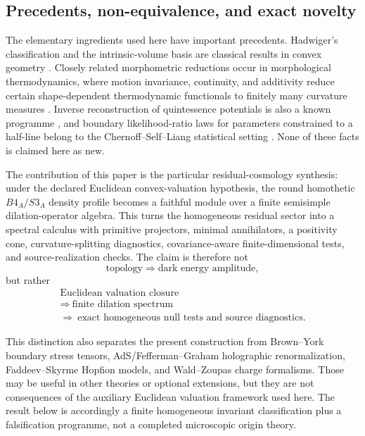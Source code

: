 \documentclass[11pt,a4paper]{article}
\def\Bfour{B4}%
\def\Sthree{S3}%
\numberwithin{equation}{section}
\theoremstyle{definition}
\theoremstyle{plain}
\theoremstyle{remark}
\newcommand{\Sthree}{S^3}
\newcommand{\Bfour}{B^4}
\begin{document}
\subsection{Precedents, non-equivalence, and exact novelty}
The elementary ingredients used here have important precedents.  Hadwiger's
classification and the intrinsic-volume basis are classical results in convex
geometry \cite{Hadwiger1957,Schneider2014}.  Closely related morphometric
reductions occur in morphological thermodynamics, where motion invariance,
continuity, and additivity reduce certain shape-dependent thermodynamic
functionals to finitely many curvature measures \cite{KonigRothMecke2004}.
Inverse reconstruction of quintessence potentials is also a known programme
\cite{SahlenLiddleParkinson2005}, and boundary likelihood-ratio laws for
parameters constrained to a half-line belong to the Chernoff--Self--Liang
statistical setting \cite{Chernoff1954,SelfLiang1987}.  None of these facts is
claimed here as new.

The contribution of this paper is the particular residual-cosmology synthesis:
under the declared Euclidean convex-valuation hypothesis, the round homothetic
\(\Bfour_A/\Sthree_A\) density profile becomes a faithful module over a finite
semisimple dilation-operator algebra.  This turns the homogeneous residual
sector into a spectral calculus with primitive projectors, minimal
annihilators, a positivity cone, curvature-splitting diagnostics,
covariance-aware finite-dimensional tests, and source-realization checks.  The
claim is therefore not
\begin{equation}
\text{topology}\Rightarrow\text{dark energy amplitude},
\end{equation}
but rather
\begin{equation}
\boxed{\begin{gathered}
\text{Euclidean valuation closure}\\[1mm]
\Rightarrow\ \text{finite dilation spectrum}\\[1mm]
\Rightarrow\ \text{exact homogeneous null tests and source diagnostics}.
\end{gathered}}
\end{equation}

This distinction also separates the present construction from Brown--York
boundary stress tensors, AdS/Fefferman--Graham holographic renormalization,
Faddeev--Skyrme Hopfion models, and Wald--Zoupas charge formalisms.  Those may
be useful in other theories or optional extensions, but they are not consequences
of the auxiliary Euclidean valuation framework used here.  The result below is
accordingly a finite homogeneous invariant classification plus a falsification
programme, not a completed microscopic origin theory.
\end{document}

